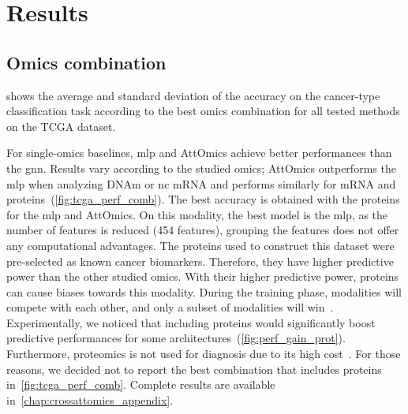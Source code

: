 \documentclass[../main.tex]{subfiles}
\begin{document}
\section{Results}
	\subsection{Omics combination}
		 shows the average and standard deviation of the accuracy on the cancer-type classification task according to the best omics combination for all tested methods on the TCGA dataset.

		For single-omics baselines, \gls{mlp} and AttOmics achieve better performances than the \gls{gnn}.
		Results vary according to the studied omics; AttOmics outperforms the \gls{mlp} when analyzing DNAm or nc mRNA and performs similarly for mRNA and proteins~(\cref{fig:tcga_perf_comb}).
		The best accuracy is obtained with the proteins for the \gls{mlp} and AttOmics.
		On this modality, the best model is the \gls{mlp}, as the number of features is reduced (454 features), grouping the features does not offer any computational advantages.
		The proteins used to construct this dataset were pre-selected as known cancer biomarkers.
		Therefore, they have higher predictive power than the other studied omics.
		With their higher predictive power, proteins can cause biases towards this modality.
		During the training phase, modalities will compete with each other, and only a subset of modalities will win~\cite{pmlr-v162-huang22e}.
		Experimentally, we noticed that including proteins would significantly boost predictive performances for some architectures~(\cref{fig:perf_gain_prot}).
		Furthermore, proteomics is not used for diagnosis due to its high cost~\cite{Mundt2023}.
		For those reasons, we decided not to report the best combination that includes proteins in~\cref{fig:tcga_perf_comb}.
		Complete results are available in~\cref{chap:crossattomics_appendix}.
\end{document}

